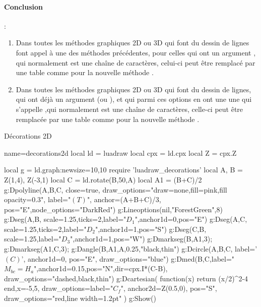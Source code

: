 \paragraph{Conclusion} : 
\begin{enumerate}
    \item Dans toutes les méthodes graphiques 2D ou 3D qui font du dessin de lignes font appel à une des méthodes précédentes, pour celles qui ont un argument , qui normalement est une chaîne de caractères, celui-ci peut être remplacé par une table  comme pour la nouvelle méthode .
    
    \item Dans toutes les méthodes graphiques 2D ou 3D qui font du dessin de lignes, qui ont déjà un argument  (ou  ), et qui parmi ces options en ont une une qui s'appelle  ,qui normalement est une chaîne de caractères, celle-ci peut être remplacée par une table  comme pour la nouvelle méthode .
\end{enumerate}

\begin{demo}{Décorations 2D}
\begin{luadraw}{name=decorations2d}
local ld = luadraw
local cpx = ld.cpx
local Z = cpx.Z

local g = ld.graph:new{size={10,10}}
require 'luadraw_decorations'
local A, B = Z(1,4), Z(-3,1)
local C = ld.rotate(B,50,A)
local A1 = (B+C)/2
g:Dpolyline({A,B,C}, {close=true, draw_options="draw=none,fill=pink,fill opacity=0.3", 
    label="$(T)$", anchor=(A+B+C)/3, pos="E",node_options="DarkRed"})
g:Lineoptions(nil,"ForestGreen",8)
g:Dseg({A,B}, {scale=1.25,ticks=2,label="$D_1$",anchor1d=0,pos="E"})
g:Dseg({A,C}, {scale=1.25,ticks=2,label="$D_2$",anchor1d=1,pos="S"})
g:Dseg({C,B}, {scale=1.25,label="$D_3$",anchor1d=1,pos="W"})
g:Dmarkseg(B,A1,3); g:Dmarkseg(A1,C,3); g:Dangle(B,A1,A,0.25,"black,thin")
g:Dcircle({A,B,C}, {label='$(C)$', anchor1d=0, pos="E", draw_options="blue"})
g:Dmed(B,C,{label="$M_{bc}=H_a$",anchor1d=0.15,pos="N",dir=cpx.I*(C-B), draw_options="dashed,black,thin"})
g:Dcartesian( function(x) return (x/2)^2-4 end,{x={-5,5},
    draw_options={label="$C_f$", anchor2d=Z(0.5,0), pos="S", draw_options="red,line width=1.2pt"} })
g:Show()
\end{luadraw}
\end{demo}

